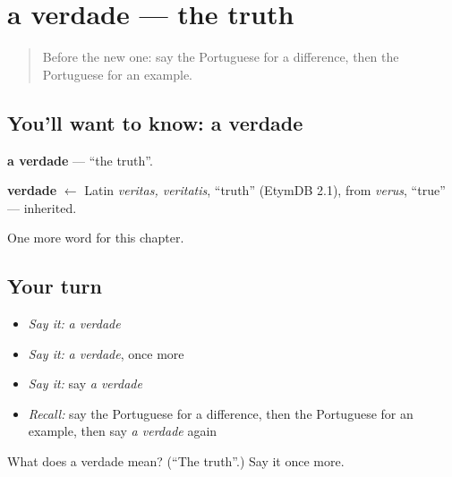 \section[a verdade]{a verdade — the truth}

\label{lesson:PT-C161-verdade}



\begin{quote}
Before the new one: say the Portuguese for a difference, then the Portuguese for an example.
\end{quote}

\subsection*{You'll want to know: a verdade}
\textbf{a verdade} — \textquotedblleft{}the truth\textquotedblright{}.

\begin{cousinweb}
\textbf{verdade} $\leftarrow$ Latin \emph{veritas, veritatis}, \textquotedblleft{}truth\textquotedblright{} (EtymDB 2.1), from \emph{verus}, \textquotedblleft{}true\textquotedblright{} — inherited.
\end{cousinweb}

\begin{grammarlens}[title={What you've built}]
One more word for this chapter.
\end{grammarlens}

\subsection*{Your turn}
\begin{itemize}
\raggedright
  \item \emph{Say it:} \emph{a verdade}
  \item \emph{Say it:} \emph{a verdade}, once more
  \item \emph{Say it:} say \emph{a verdade}
  \item \emph{Recall:} say the Portuguese for a difference, then the Portuguese for an example, then say \emph{a verdade} again
\end{itemize}

\begin{tcolorbox}[breakable,colback=teal!4,colframe=teal!35!black,title={Before you move on}]
What does a verdade mean? (\textquotedblleft{}The truth\textquotedblright{}.) Say it once more.
\end{tcolorbox}
